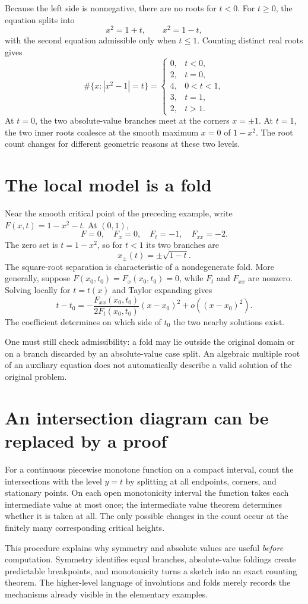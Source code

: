 Because the left side is nonnegative, there are no roots for \(t<0\). For \(t\ge0\), the equation splits into
\[
 x^2=1+t,\qquad x^2=1-t,
\]
with the second equation admissible only when \(t\le1\). Counting distinct real roots gives
\[
 \boxed{
 \#\{x:|x^2-1|=t\}=
 \begin{cases}
 0,&t<0,\\
 2,&t=0,\\
 4,&0<t<1,\\
 3,&t=1,\\
 2,&t>1.
 \end{cases}}
\]
At \(t=0\), the two absolute-value branches meet at the corners \(x=\pm1\). At \(t=1\), the two inner roots coalesce at the smooth maximum \(x=0\) of \(1-x^2\). The root count changes for different geometric reasons at these two levels.

\section{The local model is a fold}

Near the smooth critical point of the preceding example, write \(F(x,t)=1-x^2-t\). At \((0,1)\),
\[
 F=0,\quad F_x=0,\quad F_t=-1,\quad F_{xx}=-2.
\]
The zero set is \(t=1-x^2\), so for \(t<1\) its two branches are
\[
 x_\pm(t)=\pm\sqrt{1-t}.
\]
The square-root separation is characteristic of a nondegenerate fold. More generally, suppose \(F(x_0,t_0)=F_x(x_0,t_0)=0\), while \(F_t\) and \(F_{xx}\) are nonzero. Solving locally for \(t=t(x)\) and Taylor expanding gives
\[
 t-t_0=-\frac{F_{xx}(x_0,t_0)}{2F_t(x_0,t_0)}
        (x-x_0)^2+o((x-x_0)^2).
\]
The coefficient determines on which side of \(t_0\) the two nearby solutions exist.

One must still check admissibility: a fold may lie outside the original domain or on a branch discarded by an absolute-value case split. An algebraic multiple root of an auxiliary equation does not automatically describe a valid solution of the original problem.

\section{An intersection diagram can be replaced by a proof}

For a continuous piecewise monotone function on a compact interval, count the intersections with the level \(y=t\) by splitting at all endpoints, corners, and stationary points. On each open monotonicity interval the function takes each intermediate value at most once; the intermediate value theorem determines whether it is taken at all. The only possible changes in the count occur at the finitely many corresponding critical heights.

This procedure explains why symmetry and absolute values are useful \emph{before} computation. Symmetry identifies equal branches, absolute-value foldings create predictable breakpoints, and monotonicity turns a sketch into an exact counting theorem. The higher-level language of involutions and folds merely records the mechanisms already visible in the elementary examples.
